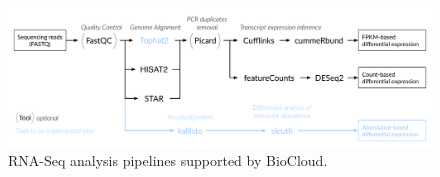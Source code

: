 \begin{figure}[!htbp]
\centering
\includegraphics[width=\textwidth]{images/rnaseq_pipelines}
\caption[RNA-Seq analysis pipelines]{RNA-Seq analysis pipelines supported by BioCloud.}
\label{fig:rnaseq-pipeline}
\end{figure}
